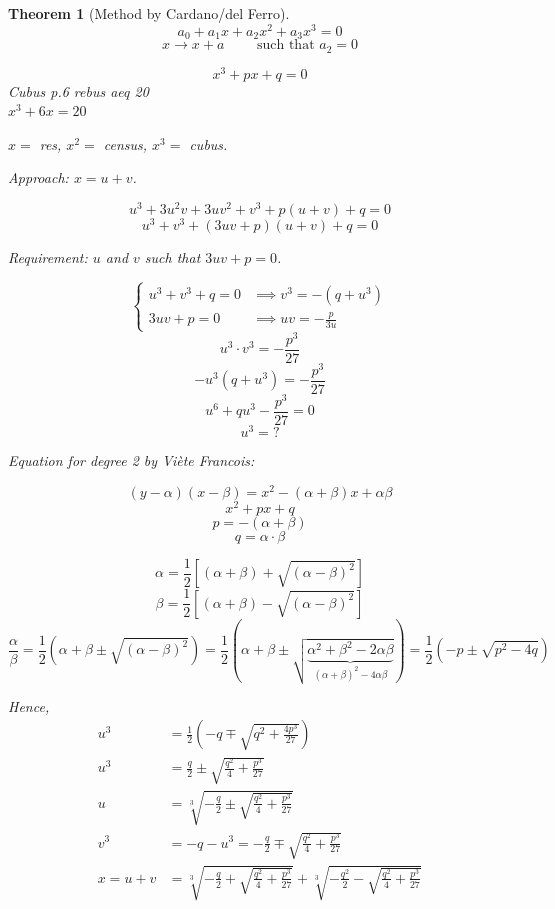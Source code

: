 \documentclass{article}
\newcounter{lecref}[section]
\numberwithin{lecref}{section}
\newtheorem{theorem}[lecref]{Theorem}
\begin{document}
\begin{theorem}[Method by Cardano/del Ferro] %
  \[ a_0 + a_1 x + a_2 x^2 + a_3 x^3 = 0 \]
  \[ x \to x + a \qquad \text{ such that } a_2 = 0 \]

  \[ x^3 + px + q = 0 \]
  Cubus p.6 rebus aeq 20 \\
  $x^3 + 6x = 20$

  $x = $ res, $x^2 = $ census, $x^3 = $ cubus.

  Approach: $x = u + v$.

  \[ u^3 + 3u^2v + 3uv^2 + v^3 + p(u + v) + q = 0 \]
  \[ u^3 + v^3 + (3uv + p)(u + v) + q = 0 \]

  Requirement:
  $u$ and $v$ such that $3uv + p = 0$.

  \[
    \begin{cases}
      u^3 + v^3 + q = 0 & \implies v^3 = -(q + u^3) \\
      3uv + p = 0 & \implies uv = -\frac{p}{3u}
    \end{cases}
  \]
  \[ u^3 \cdot v^3 = -\frac{p^3}{27} \]
  \[ -u^3 (q + u^3) = -\frac{p^3}{27} \]
  \[ u^6 + qu^3 - \frac{p^3}{27} = 0 \]
  \[ u^3 = ? \]

  Equation for degree 2 by Vi\`ete Francois:

  \[ (y - \alpha)(x - \beta) = x^2 - (\alpha + \beta) x + \alpha \beta \]
  \[ x^2 + px + q \]
  \[ p = -(\alpha + \beta) \]
  \[ q = \alpha \cdot \beta \]

  \[ \alpha = \frac12 \left[(\alpha + \beta) + \sqrt{(\alpha - \beta)^2}\right] \]
  \[ \beta = \frac12 \left[(\alpha + \beta) - \sqrt{(\alpha - \beta)^2}\right] \]
  \[
    \frac\alpha\beta = \frac12 \left(\alpha + \beta \pm \sqrt{(\alpha - \beta)^2}\right)
    = \frac12 \left(\alpha + \beta \pm \sqrt{\underbrace{\alpha^2 + \beta^2 - 2\alpha\beta}_{(\alpha + \beta)^2 - 4\alpha\beta}}\right)
    = \frac12 \left(-p \pm \sqrt{p^2 - 4q}\right)
  \]

  Hence,
  \begin{align*}
    u^3 &= \frac12\left(-q \mp \sqrt{q^2 + \frac{4p^3}{27}}\right) \\
    u^3 &= \frac{q}2 \pm \sqrt{\frac{q^2}{4} + \frac{p^3}{27}} \\
    u &= \sqrt[3]{-\frac{q}2 \pm \sqrt{\frac{q^2}{4} + \frac{p^3}{27}}} \\
    v^3 &= -q - u^3 = -\frac{q}{2} \mp \sqrt{\frac{q^2}{4} + \frac{p^3}{27}} \\
    x = u + v &= \sqrt[3]{-\frac{q}2 + \sqrt{\frac{q^2}{4} + \frac{p^3}{27}}} + \sqrt[3]{-\frac{q^2}{2} - \sqrt{\frac{q^2}{4} + \frac{p^3}{27}}}
  \end{align*}
\end{theorem}
\end{document}
